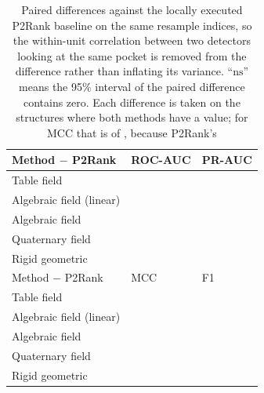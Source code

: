 \documentclass[11pt]{article}
\begin{document}
\begin{table}[h]
\centering
\small
\setlength{\tabcolsep}{3pt}
\begin{tabular}{@{}lll@{}}
\toprule
Method \(-\) P2Rank & ROC-AUC & PR-AUC\\
\midrule
Table field              & \TabAucD{} \TabAucDCI{}\TabAucNS{}
                         & \TabPrD{} \TabPrDCI{}\TabPrNS{}\\
Algebraic field (linear) & \AlgLinAucD{} \AlgLinAucDCI{}\AlgLinAucNS{}
                         & \AlgLinPrD{} \AlgLinPrDCI{}\AlgLinPrNS{}\\
Algebraic field          & \AlgAucD{} \AlgAucDCI{}\AlgAucNS{}
                         & \AlgPrD{} \AlgPrDCI{}\AlgPrNS{}\\
Quaternary field         & \QlutAucD{} \QlutAucDCI{}\QlutAucNS{}
                         & \QlutPrD{} \QlutPrDCI{}\QlutPrNS{}\\
Rigid geometric          & \GeoAucD{} \GeoAucDCI{}\GeoAucNS{}
                         & \GeoPrD{} \GeoPrDCI{}\GeoPrNS{}\\
\midrule
Method \(-\) P2Rank & MCC & F1\\
\midrule
Table field              & \TabMccD{} \TabMccDCI{}\TabMccNS{}
                         & \TabFOneD{} \TabFOneDCI{}\TabFOneNS{}\\
Algebraic field (linear) & \AlgLinMccD{} \AlgLinMccDCI{}\AlgLinMccNS{}
                         & \AlgLinFOneD{} \AlgLinFOneDCI{}\AlgLinFOneNS{}\\
Algebraic field          & \AlgMccD{} \AlgMccDCI{}\AlgMccNS{}
                         & \AlgFOneD{} \AlgFOneDCI{}\AlgFOneNS{}\\
Quaternary field         & \QlutMccD{} \QlutMccDCI{}\QlutMccNS{}
                         & \QlutFOneD{} \QlutFOneDCI{}\QlutFOneNS{}\\
Rigid geometric          & \GeoMccD{} \GeoMccDCI{}\GeoMccNS{}
                         & \GeoFOneD{} \GeoFOneDCI{}\GeoFOneNS{}\\
\bottomrule
\end{tabular}
\caption{Paired differences against the locally executed P2Rank baseline on the
same resample indices, so the within-unit correlation between two detectors
looking at the same pocket is removed from the difference rather than inflating
its variance. ``\(\text{ns}\)'' means the 95\% interval of the paired difference
contains zero. Each difference is taken on the structures where both methods
have a value; for MCC that is \TabMccNPaired{} of \NUnits{}, because P2Rank's
}
\end{table}
\end{document}
